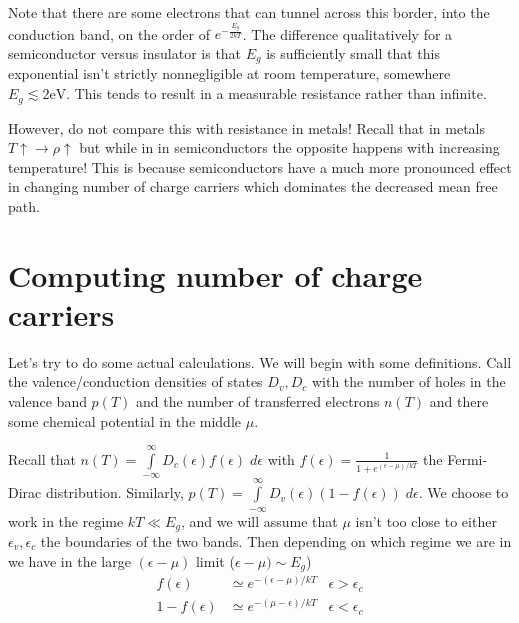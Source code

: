 \documentclass[10pt]{report}
\begin{document}
Note that there are some electrons that can tunnel across this border, into the conduction band, on the order of $e^{-\frac{E_g}{2kT}}$. The difference qualitatively for a semiconductor versus insulator is that $E_g$ is sufficiently small that this exponential isn't strictly nonnegligible at room temperature, somewhere $E_g \lesssim 2\mathrm{eV}$. This tends to result in a measurable resistance rather than infinite.

However, do not compare this with resistance in metals! Recall that in metals $T\uparrow \to \rho \uparrow$ but while in in semiconductors the opposite happens with increasing temperature! This is because semiconductors have a much more pronounced effect in changing number of charge carriers which dominates the decreased mean free path.

\section{Computing number of charge carriers}

Let's try to do some actual calculations. We will begin with some definitions. Call the valence/conduction densities of states $D_v, D_c$ with the number of holes in the valence band $p(T)$ and the number of transferred electrons $n(T)$ and there some chemical potential in the middle $\mu$. 

Recall that $n(T) = \int\limits_{-\infty}^{\infty}D_c(\epsilon) f(\epsilon)\;d\epsilon$ with $f(\epsilon) = \frac{1}{1 + e^{(\epsilon - \mu)/kT}}$ the Fermi-Dirac distribution. Similarly, $p(T) = \int\limits_{-\infty}^{\infty}D_v(\epsilon)\left( 1 - f(\epsilon) \right)\;d\epsilon$. We choose to work in the regime $kT \ll E_g$, and we will assume that $\mu$ isn't too close to either $\epsilon_v, \epsilon_c$ the boundaries of the two bands. Then depending on which regime we are in we have in the large $(\epsilon - \mu)$ limit ($\epsilon - \mu) \sim E_g$)
\begin{align}
    f(\epsilon) &\simeq e^{-(\epsilon - \mu)/kT} & \epsilon > \epsilon_c\\
    1 - f(\epsilon) &\simeq e^{-(\mu- \epsilon )/kT} & \epsilon < \epsilon_c
\end{align}
\end{document}
